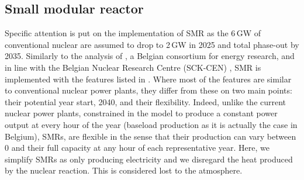 \subsection{Small modular reactor}
\label{subsec:cs:SMR_tech}

Specific attention is put on the implementation of \gls{SMR} as the 6\,GW of conventional nuclear are assumed to drop to 2\,GW in 2025 and total phase-out by 2035. Similarly to the analysis of \citet{PATHS2050}, a Belgian consortium for energy research, and in line with the Belgian Nuclear Research Centre (SCK-CEN) \cite{SCK-CEN_SMR}, \gls{SMR} is implemented with the features listed in . Where most of the features are similar to conventional nuclear power plants, they differ from these on two main points: their potential year start, 2040, and their flexibility. Indeed, unlike the current nuclear power plants, constrained in the model to produce a constant power output at every hour of the year (\ie baseload production as it is actually the case in Belgium), SMRs, are flexible in the sense that their production can vary between 0 and their full capacity at any hour of each representative year. Here, we simplify SMRs as only producing electricity and we disregard the heat produced by the nuclear reaction. This is considered lost to the atmosphere.

